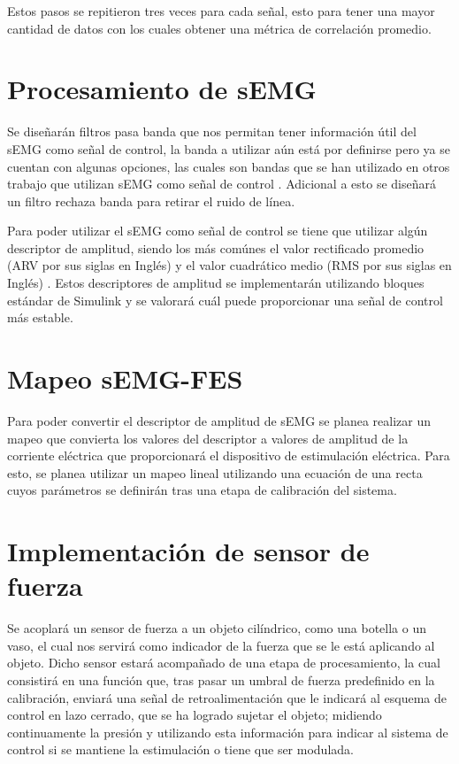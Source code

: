 Estos pasos se repitieron tres veces para cada señal, esto para tener una mayor cantidad de datos con los cuales obtener una métrica de correlación promedio.

\section{Procesamiento de sEMG}
Se diseñarán filtros pasa banda que nos permitan tener información útil del sEMG como señal de control, la banda a utilizar aún está por definirse pero ya se cuentan con algunas opciones, las cuales son bandas que se han utilizado en otros trabajo que utilizan sEMG como señal de control \cite{Lenzi2012}\cite{Lenzi2011}\cite{Raafat}. Adicional a esto se diseñará un filtro rechaza banda para retirar el ruido de línea.

Para poder utilizar el sEMG como señal de control se tiene que utilizar algún descriptor de amplitud, siendo los más comúnes el valor rectificado promedio (ARV por sus siglas en Inglés) y el valor cuadrático medio (RMS por sus siglas en Inglés) \cite{Cavalcanti-Garcia2009}. Estos descriptores de amplitud se implementarán utilizando bloques estándar de Simulink y se valorará cuál puede proporcionar una señal de control más estable.

\section{Mapeo sEMG-FES}
Para poder convertir el descriptor de amplitud de sEMG se planea realizar un mapeo que convierta los valores del descriptor a valores de amplitud de la corriente eléctrica que proporcionará el dispositivo de estimulación eléctrica. Para esto, se planea utilizar un mapeo lineal utilizando una ecuación de una recta cuyos parámetros se definirán tras una etapa de calibración del sistema.

\section{Implementación de sensor de fuerza}
Se acoplará un sensor de fuerza a un objeto cilíndrico, como una botella o un vaso, el cual nos servirá como indicador de la fuerza que se le está aplicando al objeto. Dicho sensor estará acompañado de una etapa de procesamiento, la cual consistirá en una función que, tras pasar un umbral de fuerza predefinido en la calibración, enviará una señal de retroalimentación que le indicará al esquema de control en lazo cerrado, que se ha logrado sujetar el objeto; midiendo continuamente la presión y utilizando esta información para indicar al sistema de control si se mantiene la estimulación o tiene que ser modulada.

